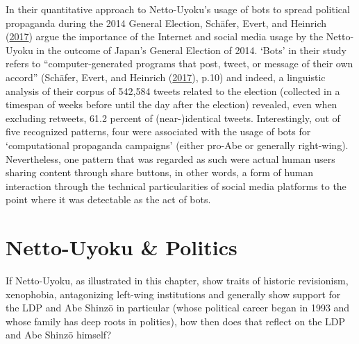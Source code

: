 \documentclass[10pt,british,A4paper,oneside]{memoir}
\begin{document}
In their quantitative approach to Netto-Uyoku's usage of bots to spread
political propaganda during the 2014 General Election, Schäfer, Evert,
and Heinrich (\protect\hyperlink{ref-schafer_japans_2017}{2017}) argue
the importance of the Internet and social media usage by the Netto-Uyoku
in the outcome of Japan's General Election of 2014. `Bots' in their
study refers to ``computer-generated programs that post, tweet, or
message of their own accord'' (Schäfer, Evert, and Heinrich
(\protect\hyperlink{ref-schafer_japans_2017}{2017}), p.10) and indeed, a
linguistic analysis of their corpus of 542,584 tweets related to the
election (collected in a timespan of weeks before until the day after
the election) revealed, even when excluding retweets, 61.2 percent of
(near-)identical tweets. Interestingly, out of five recognized patterns,
four were associated with the usage of bots for `computational
propaganda campaigns' (either pro-Abe or generally right-wing).
Nevertheless, one pattern that was regarded as such were actual human
users sharing content through share buttons, in other words, a form of
human interaction through the technical particularities of social media
platforms to the point where it was detectable as the act of bots.

\section{Netto-Uyoku \& Politics}\label{netto-uyoku-politics}

If Netto-Uyoku, as illustrated in this chapter, show traits of historic
revisionism, xenophobia, antagonizing left-wing institutions and
generally show support for the LDP and Abe Shinzō in particular (whose
political career began in 1993 and whose family has deep roots in
politics), how then does that reflect on the LDP and Abe Shinzō himself?
\end{document}
